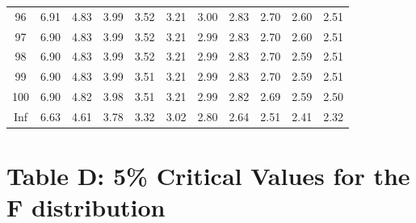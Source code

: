 \documentclass[
]{book}
\theoremstyle{definition}
\theoremstyle{definition}
\theoremstyle{definition}
\theoremstyle{definition}
\theoremstyle{remark}
\begin{document}
\begin{longtable}[]{@{}ccccccccccc@{}}
96 & 6.91 & 4.83 & 3.99 & 3.52 & 3.21 & 3.00 & 2.83 & 2.70 & 2.60 & 2.51 \\
97 & 6.90 & 4.83 & 3.99 & 3.52 & 3.21 & 2.99 & 2.83 & 2.70 & 2.60 & 2.51 \\
98 & 6.90 & 4.83 & 3.99 & 3.52 & 3.21 & 2.99 & 2.83 & 2.70 & 2.59 & 2.51 \\
99 & 6.90 & 4.83 & 3.99 & 3.51 & 3.21 & 2.99 & 2.83 & 2.70 & 2.59 & 2.51 \\
100 & 6.90 & 4.82 & 3.98 & 3.51 & 3.21 & 2.99 & 2.82 & 2.69 & 2.59 & 2.50 \\
Inf & 6.63 & 4.61 & 3.78 & 3.32 & 3.02 & 2.80 & 2.64 & 2.51 & 2.41 & 2.32 \\
\end{longtable}

\hypertarget{table-d-5-critical-values-for-the-f-distribution}{%
\section*{Table D: 5\% Critical Values for the F distribution}\label{table-d-5-critical-values-for-the-f-distribution}}
\end{document}
